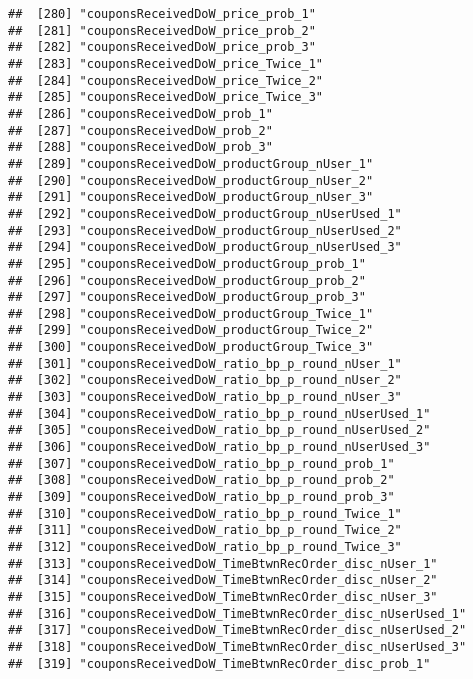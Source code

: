 \documentclass[10pt]{report}
\begin{document}
\begin{verbatim}
##  [280] "couponsReceivedDoW_price_prob_1"                      
##  [281] "couponsReceivedDoW_price_prob_2"                      
##  [282] "couponsReceivedDoW_price_prob_3"                      
##  [283] "couponsReceivedDoW_price_Twice_1"                     
##  [284] "couponsReceivedDoW_price_Twice_2"                     
##  [285] "couponsReceivedDoW_price_Twice_3"                     
##  [286] "couponsReceivedDoW_prob_1"                            
##  [287] "couponsReceivedDoW_prob_2"                            
##  [288] "couponsReceivedDoW_prob_3"                            
##  [289] "couponsReceivedDoW_productGroup_nUser_1"              
##  [290] "couponsReceivedDoW_productGroup_nUser_2"              
##  [291] "couponsReceivedDoW_productGroup_nUser_3"              
##  [292] "couponsReceivedDoW_productGroup_nUserUsed_1"          
##  [293] "couponsReceivedDoW_productGroup_nUserUsed_2"          
##  [294] "couponsReceivedDoW_productGroup_nUserUsed_3"          
##  [295] "couponsReceivedDoW_productGroup_prob_1"               
##  [296] "couponsReceivedDoW_productGroup_prob_2"               
##  [297] "couponsReceivedDoW_productGroup_prob_3"               
##  [298] "couponsReceivedDoW_productGroup_Twice_1"              
##  [299] "couponsReceivedDoW_productGroup_Twice_2"              
##  [300] "couponsReceivedDoW_productGroup_Twice_3"              
##  [301] "couponsReceivedDoW_ratio_bp_p_round_nUser_1"          
##  [302] "couponsReceivedDoW_ratio_bp_p_round_nUser_2"          
##  [303] "couponsReceivedDoW_ratio_bp_p_round_nUser_3"          
##  [304] "couponsReceivedDoW_ratio_bp_p_round_nUserUsed_1"      
##  [305] "couponsReceivedDoW_ratio_bp_p_round_nUserUsed_2"      
##  [306] "couponsReceivedDoW_ratio_bp_p_round_nUserUsed_3"      
##  [307] "couponsReceivedDoW_ratio_bp_p_round_prob_1"           
##  [308] "couponsReceivedDoW_ratio_bp_p_round_prob_2"           
##  [309] "couponsReceivedDoW_ratio_bp_p_round_prob_3"           
##  [310] "couponsReceivedDoW_ratio_bp_p_round_Twice_1"          
##  [311] "couponsReceivedDoW_ratio_bp_p_round_Twice_2"          
##  [312] "couponsReceivedDoW_ratio_bp_p_round_Twice_3"          
##  [313] "couponsReceivedDoW_TimeBtwnRecOrder_disc_nUser_1"     
##  [314] "couponsReceivedDoW_TimeBtwnRecOrder_disc_nUser_2"     
##  [315] "couponsReceivedDoW_TimeBtwnRecOrder_disc_nUser_3"     
##  [316] "couponsReceivedDoW_TimeBtwnRecOrder_disc_nUserUsed_1" 
##  [317] "couponsReceivedDoW_TimeBtwnRecOrder_disc_nUserUsed_2" 
##  [318] "couponsReceivedDoW_TimeBtwnRecOrder_disc_nUserUsed_3" 
##  [319] "couponsReceivedDoW_TimeBtwnRecOrder_disc_prob_1"      

\end{verbatim}
\end{document}
